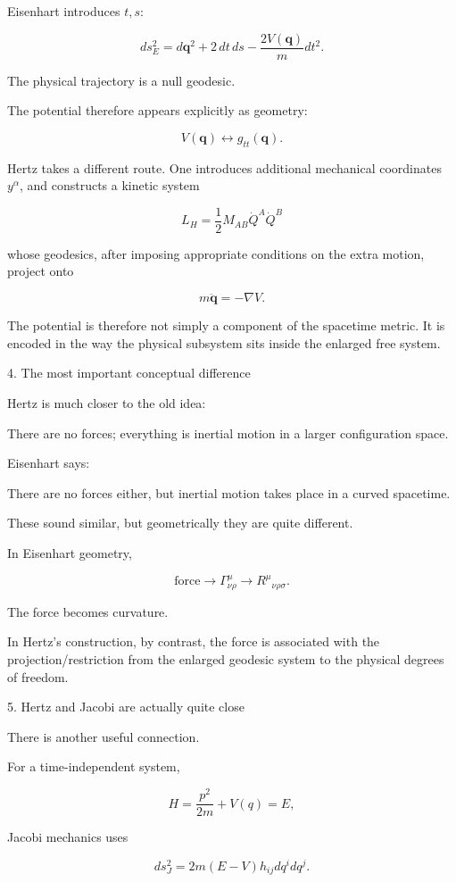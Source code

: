 Eisenhart introduces \(t,s\):

$$ ds_E^2 = d\mathbf q^2+2\,dt\,ds -\frac{2V(\mathbf q)}{m}dt^2. $$

The physical trajectory is a null geodesic.

The potential therefore appears explicitly as geometry:

$$ V(\mathbf q) \longleftrightarrow g_{tt}(\mathbf q). $$

Hertz takes a different route. One introduces additional mechanical coordinates \(y^\alpha\), and constructs a kinetic system

$$ L_H=\frac12M_{AB}\dot Q^A\dot Q^B $$

whose geodesics, after imposing appropriate conditions on the extra motion, project onto

$$ m\ddot{\mathbf q}=-\nabla V. $$

The potential is therefore not simply a component of the spacetime metric. It is encoded in the way the physical subsystem sits inside the enlarged free system.

4. The most important conceptual difference

Hertz is much closer to the old idea:

There are no forces; everything is inertial motion in a larger configuration space.

Eisenhart says:

There are no forces either, but inertial motion takes place in a curved spacetime.

These sound similar, but geometrically they are quite different.

In Eisenhart geometry,

$$ \boxed{ \text{force} \rightarrow \Gamma^\mu_{\nu\rho} \rightarrow R^\mu{}_{\nu\rho\sigma}. } $$

The force becomes curvature.

In Hertz's construction, by contrast, the force is associated with the projection/restriction from the enlarged geodesic system to the physical degrees of freedom.

5. Hertz and Jacobi are actually quite close

There is another useful connection.

For a time-independent system,

$$ H=\frac{p^2}{2m}+V(q)=E, $$

Jacobi mechanics uses

$$ ds_J^2 = 2m(E-V)h_{ij}dq^i dq^j. $$

